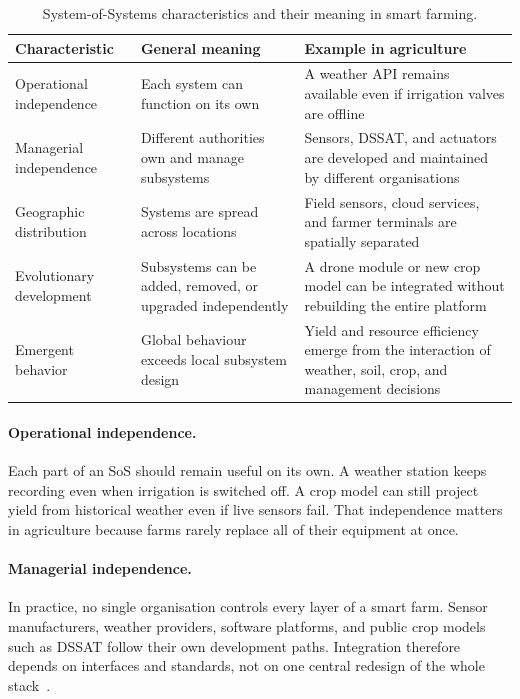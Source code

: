 \begin{table}[ht]
  \centering
  \caption{System-of-Systems characteristics and their meaning in smart farming.}
  \label{tab:sos_characteristics}
  \begin{tabular}{p{3.2cm} p{4.3cm} p{6.3cm}}
    \toprule
    \textbf{Characteristic} & \textbf{General meaning} & \textbf{Example in agriculture} \\
    \midrule
    Operational independence &
    Each system can function on its own &
    A weather API remains available even if irrigation valves are offline \\[4pt]

    Managerial independence &
    Different authorities own and manage subsystems &
    Sensors, DSSAT, and actuators are developed and maintained by different organisations \\[4pt]

    Geographic distribution &
    Systems are spread across locations &
    Field sensors, cloud services, and farmer terminals are spatially separated \\[4pt]

    Evolutionary development &
    Subsystems can be added, removed, or upgraded independently &
    A drone module or new crop model can be integrated without rebuilding the entire platform \\[4pt]

    Emergent behavior &
    Global behaviour exceeds local subsystem design &
    Yield and resource efficiency emerge from the interaction of weather, soil, crop, and management decisions \\
    \bottomrule
  \end{tabular}
\end{table}

\paragraph{Operational independence.}
Each part of an SoS should remain useful on its own. A weather station keeps
recording even when irrigation is switched off. A crop model can still project
yield from historical weather even if live sensors fail. That independence matters
in agriculture because farms rarely replace all of their equipment at once.

\paragraph{Managerial independence.}
In practice, no single organisation controls every layer of a smart farm. Sensor
manufacturers, weather providers, software platforms, and public crop models
such as DSSAT follow their own development paths. Integration therefore depends
on interfaces and standards, not on one central redesign of the whole
stack~\cite{madni2014integration}.

